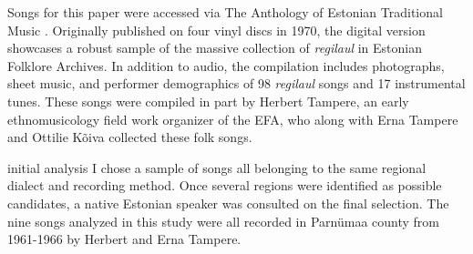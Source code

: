 %
%




Songs for this paper were accessed via The Anthology of Estonian Traditional Music \citep{tampere2016}. Originally published on four vinyl discs in 1970, the digital version showcases a robust sample of the massive collection of {\it regilaul} in Estonian Folklore Archives. In addition to audio, the  compilation includes  photographs, sheet music, and performer demographics of 98 {\it regilaul} songs and 17 instrumental tunes. 
These songs were compiled in part by Herbert Tampere, an early ethnomusicology field work organizer of the EFA, who along with Erna Tampere and Ottilie Kõiva collected these folk songs\citep{oras2002, tampere2016}. 

 initial analysis I chose a sample of songs all belonging to the same regional dialect and recording method. Once several regions were identified as possible candidates, a native Estonian speaker was consulted on the final selection. The nine songs analyzed in this study were all recorded in Parnümaa county from 1961-1966 by Herbert and Erna Tampere. 


